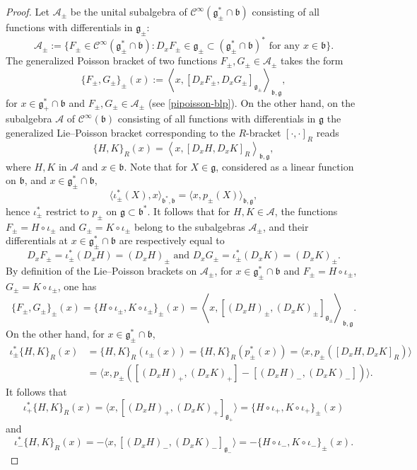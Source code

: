 \documentclass[a4paper,12pt,reqno]{amsart}%
\theoremstyle{definition}
\theoremstyle{remark}
\numberwithin{theorem}{section}
\numberwithin{equation}{section}
\newcommand{\1}{{\bf 1}}
\newcommand{\Cp}{\mathscr{C}}
\newcommand{\g}{{\mathfrak g}}
\newcommand{\bg}{{\mathfrak b}}
\begin{document}
     \begin{proof}
Let $\mathcal{A}_\pm$ be the unital subalgebra of $\Cp^{\infty}(\g_\pm^*\cap\bg)$ consisting of all  functions with differentials in $\g_\pm$:
\[
 \mathcal{A}_\pm :=\{ F_\pm \in \Cp^\infty(\g_\pm^*\cap\bg): D_xF_\pm \in \g_\pm\subset (\g_\pm^*\cap\bg)^* \textrm{ for any }x\in\bg\}.
\]
The generalized Poisson bracket of two functions $F_\pm, G_\pm\in\mathcal{A}_\pm$ takes the form
\begin{equation}
\{F_\pm, G_\pm\}_\pm(x) := \left\langle x, [D_xF_\pm, D_xG_\pm]_{\g_\pm}\right\rangle_{\bg, \g},
\end{equation}
   for $x\in \g_+^*\cap\bg$ and $F_\pm, G_\pm\in\mathcal{A}_\pm$ (see \eqref{pipoisson-blp}). On the other hand, on the subalgebra $\mathcal{A}$ of $\Cp^{\infty}(\bg)$ consisting of all  functions with differentials in $\g$
the generalized Lie--Poisson bracket corresponding to the $R$-bracket $[\cdot,\cdot]_R$ reads  
\begin{equation}
\{H, K\}_R(x) = \left\langle x, [D_xH, D_xK]_R\right\rangle_{\bg, \g},
\end{equation}
where $H, K$ in $\mathcal{A}$ and $x\in \bg$. Note that for $X\in\g$, considered as a linear function on $\bg$, and $x\in \g_\pm^*\cap\bg$, 
\[
\langle \iota_\pm^*(X), x\rangle_{\bg^*,\bg} = \langle x, p_\pm(X)\rangle_{\bg, \g},
\]
hence $\iota_\pm^*$ restrict to $p_\pm$ on $\g\subset \bg^*$. 
It follows that  for $H, K\in \mathcal{A}$, the functions $F_\pm = H\circ \iota_\pm$ and $G_\pm = K\circ \iota_\pm$ belong to the subalgebras $\mathcal{A}_\pm$, and their differentials at $x \in \g_\pm^*\cap\bg$ are respectively equal to
\[
D_xF_\pm = \iota_\pm^*(D_xH) = (D_xH)_\pm\textrm{  and  } D_xG_\pm = \iota_\pm^*(D_xK) = (D_xK)_\pm.
\]
By definition of the Lie--Poisson brackets on $\mathcal{A}_\pm$, for $x\in \g_\pm^*\cap\bg$ and $F_\pm =  H\circ \iota_\pm$, $G_\pm =  K\circ \iota_\pm$, one has
\[
\{F_\pm, G_\pm\}_\pm(x) = \{ H\circ \iota_\pm,  K\circ \iota_\pm\}_\pm(x)  = \left\langle x, [(D_xH)_\pm, (D_xK)_\pm]_{\g_\pm}\right\rangle_{\bg, \g} .
\]
On the other hand, for $x \in \g_\pm^*\cap\bg$,
\begin{align*}
\iota_\pm^*\{H, K\}_R(x) &= \{H, K\}_R(\iota_\pm(x)) = \{H, K\}_R(p^*_\pm(x)) = \langle x, p_{\pm}([D_xH, D_x K]_R)\rangle\\
& = \langle x, p_{\pm}([(D_xH)_+, (D_x K)_+] - [(D_xH)_-, (D_x K)_-])\rangle.
\end{align*}
It follows that 
\[
\iota_+^*\{H, K\}_R(x)  = \langle x, [(D_xH)_+, (D_x K)_+]_{\g_+}\rangle  = \{ H\circ \iota_+,  K\circ \iota_+\}_\pm(x)
\]
and 
\[
\iota_-^*\{H, K\}_R(x)  = -\langle x,  [(D_xH)_-, (D_x K)_{-}]_{\g_-}\rangle = -\{ H\circ \iota_-, K\circ \iota_-\}_\pm(x).
\]
     \end{proof}
\end{document}
